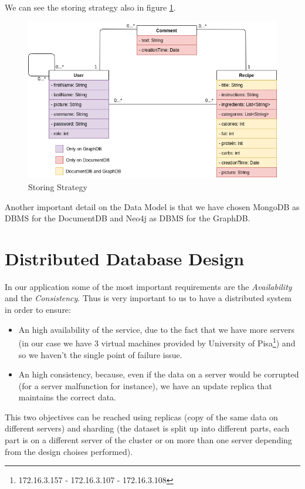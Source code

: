 \documentclass[a4paper]{report}
\begin{document}
\noindent We can see the storing strategy also in figure \ref{img: Storing Strategy}.

\begin{figure}[htpb]
	\centering
	\includegraphics[scale=0.5]{img/UML_colorato.png}
	\caption{Storing Strategy}
	\label{img: Storing Strategy}
\end{figure}

\noindent Another important detail on the Data Model is that we have chosen MongoDB as DBMS for the DocumentDB and Neo4j as DBMS for the GraphDB.

\section{Distributed Database Design}
In our application some of the most important requirements are the \emph{Availability} and the \emph{Consistency}. Thus is very important to us to have a distributed system in order to ensure:
\begin{itemize}
	\item An high availability of the service, due to the fact that we have more servers (in our case we have 3 virtual machines provided by University of Pisa\footnote{172.16.3.157 - 172.16.3.107 -  172.16.3.108}) and so we haven't the single point of failure issue.
	\item An high consistency, because, even if the data on a server would be corrupted (for a server malfunction for instance), we have an update replica that maintains the correct data.
\end{itemize}

\noindent This two objectives can be reached using replicas (copy of the same data on different servers) and sharding (the dataset is split up into different parts, each part is on a different server of the cluster or on more than one server depending from the design choises performed).
\end{document}
